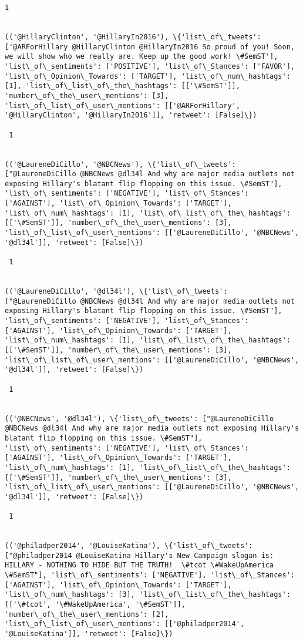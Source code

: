 \documentclass[11pt]{article}
\begin{document}
\begin{Verbatim}[commandchars=\\\{\}]
 1
 

(('@HillaryClinton', '@HillaryIn2016'), \{'list\_of\_tweets': ['@ARForHillary @HillaryClinton @HillaryIn2016 So proud of you! Soon, we will show who we really are. Keep up the good work! \#SemST'], 'list\_of\_sentiments': ['POSITIVE'], 'list\_of\_Stances': ['FAVOR'], 'list\_of\_Opinion\_Towards': ['TARGET'], 'list\_of\_num\_hashtags': [1], 'list\_of\_list\_of\_the\_hashtags': [['\#SemST']], 'number\_of\_the\_user\_mentions': [3], 'list\_of\_list\_of\_user\_mentions': [['@ARForHillary', '@HillaryClinton', '@HillaryIn2016']], 'retweet': [False]\})

 1
 

(('@LaureneDiCillo', '@NBCNews'), \{'list\_of\_tweets': ["@LaureneDiCillo @NBCNews @dl34l And why are major media outlets not exposing Hillary's blatant flip flopping on this issue. \#SemST"], 'list\_of\_sentiments': ['NEGATIVE'], 'list\_of\_Stances': ['AGAINST'], 'list\_of\_Opinion\_Towards': ['TARGET'], 'list\_of\_num\_hashtags': [1], 'list\_of\_list\_of\_the\_hashtags': [['\#SemST']], 'number\_of\_the\_user\_mentions': [3], 'list\_of\_list\_of\_user\_mentions': [['@LaureneDiCillo', '@NBCNews', '@dl34l']], 'retweet': [False]\})

 1
 

(('@LaureneDiCillo', '@dl34l'), \{'list\_of\_tweets': ["@LaureneDiCillo @NBCNews @dl34l And why are major media outlets not exposing Hillary's blatant flip flopping on this issue. \#SemST"], 'list\_of\_sentiments': ['NEGATIVE'], 'list\_of\_Stances': ['AGAINST'], 'list\_of\_Opinion\_Towards': ['TARGET'], 'list\_of\_num\_hashtags': [1], 'list\_of\_list\_of\_the\_hashtags': [['\#SemST']], 'number\_of\_the\_user\_mentions': [3], 'list\_of\_list\_of\_user\_mentions': [['@LaureneDiCillo', '@NBCNews', '@dl34l']], 'retweet': [False]\})

 1
 

(('@NBCNews', '@dl34l'), \{'list\_of\_tweets': ["@LaureneDiCillo @NBCNews @dl34l And why are major media outlets not exposing Hillary's blatant flip flopping on this issue. \#SemST"], 'list\_of\_sentiments': ['NEGATIVE'], 'list\_of\_Stances': ['AGAINST'], 'list\_of\_Opinion\_Towards': ['TARGET'], 'list\_of\_num\_hashtags': [1], 'list\_of\_list\_of\_the\_hashtags': [['\#SemST']], 'number\_of\_the\_user\_mentions': [3], 'list\_of\_list\_of\_user\_mentions': [['@LaureneDiCillo', '@NBCNews', '@dl34l']], 'retweet': [False]\})

 1
 

(('@philadper2014', '@LouiseKatina'), \{'list\_of\_tweets': ["@philadper2014 @LouiseKatina Hillary's New Campaign slogan is:  HILLARY - NOTHING TO HIDE BUT THE TRUTH!  \#tcot \#WakeUpAmerica \#SemST"], 'list\_of\_sentiments': ['NEGATIVE'], 'list\_of\_Stances': ['AGAINST'], 'list\_of\_Opinion\_Towards': ['TARGET'], 'list\_of\_num\_hashtags': [3], 'list\_of\_list\_of\_the\_hashtags': [['\#tcot', '\#WakeUpAmerica', '\#SemST']], 'number\_of\_the\_user\_mentions': [2], 'list\_of\_list\_of\_user\_mentions': [['@philadper2014', '@LouiseKatina']], 'retweet': [False]\})


\end{Verbatim}
\end{document}
